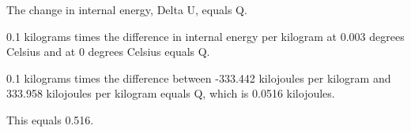 The change in internal energy, Delta U, equals Q.

0.1 kilograms times the difference in internal energy per kilogram at 0.003 degrees Celsius and at 0 degrees Celsius equals Q.

0.1 kilograms times the difference between -333.442 kilojoules per kilogram and 333.958 kilojoules per kilogram equals Q, which is 0.0516 kilojoules.

This equals 0.516.